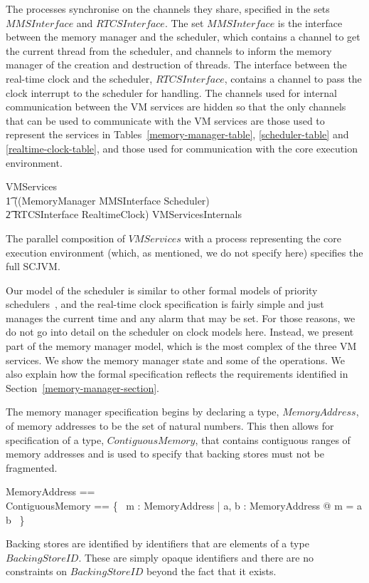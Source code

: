 \documentclass[a4paper,10pt]{report}
\begin{document}
The processes synchronise on the channels they share, specified in the
sets $MMSInterface$ and $RTCSInterface$. The set $MMSInterface$ is the interface
between the memory manager and the scheduler, which contains a channel to get
the current thread from the scheduler, and channels to inform the memory manager
of the creation and destruction of threads. The interface between the real-time
clock and the scheduler, $RTCSInterface$, contains a channel to pass the clock
interrupt to the scheduler for handling. The channels used for internal
communication between the VM services are hidden so that the only channels that
can be used to communicate with the VM services are those used to represent the
services in Tables~\ref{memory-manager-table}, \ref{scheduler-table} and
\ref{realtime-clock-table}, and those used for communication with the core
execution environment.
%
\begin{circus}
  VMServices \circdef \\
  \t1 ((MemoryManager \lpar MMSInterface \rpar Scheduler) \\
  \t2 \lpar RTCSInterface \rpar RealtimeClock) \circhide VMServicesInternals
\end{circus}
%
The parallel composition of $VMServices$ with a process representing the core
execution environment (which, as mentioned, we do not specify here)
specifies the full SCJVM.

Our model of the scheduler is similar to other formal models of priority
schedulers~\cite{ferreira2014, gotsman2013, klein2014, lime2009}, and the
real-time clock specification is fairly simple and just manages the current time
and any alarm that may be set. For those reasons, we do not go into detail on
the scheduler on clock models here. Instead, we present part of the memory
manager model, which is the most complex of the three VM services.  We show the
memory manager state and some of the operations. We also explain how the formal
specification reflects the requirements identified in
Section~\ref{memory-manager-section}.

The memory manager specification begins by declaring a type, $MemoryAddress$, of
memory addresses to be the set of natural numbers.  This then allows for
specification of a type, $ContiguousMemory$, that contains contiguous ranges of
memory addresses and is used to specify that backing stores must not be
fragmented.
%
\begin{zed}
  MemoryAddress == \nat \\
  ContiguousMemory == 
  \{~ m : \power MemoryAddress | \exists a, b : MemoryAddress @ m = a \upto b ~\}
\end{zed}
%
Backing stores are identified by identifiers that are elements of a type
$BackingStoreID$. These are simply opaque identifiers and there are no
constraints on $BackingStoreID$ beyond the fact that it exists.
\end{document}
